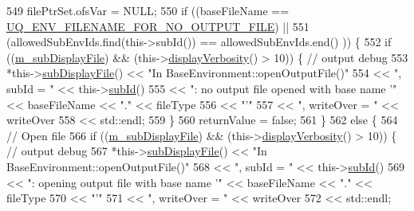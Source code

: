 \begin{DoxyCode}
549   filePtrSet.ofsVar = NULL;
550   \textcolor{keywordflow}{if} ((baseFileName                         == 
      \hyperlink{_environment_options_8h_a0b152a87af300fefc74156efb1526e67}{UQ\_ENV\_FILENAME\_FOR\_NO\_OUTPUT\_FILE}) ||
551       (allowedSubEnvIds.find(this->subId()) == allowedSubEnvIds.end()            )) \{
552     \textcolor{keywordflow}{if} ((\hyperlink{class_q_u_e_s_o_1_1_base_environment_a52b4275aa8ee85994dd304d9fe95c9c5}{m\_subDisplayFile}) && (this->\hyperlink{class_q_u_e_s_o_1_1_base_environment_a1fe5f244fc0316a0ab3e37463f108b96}{displayVerbosity}() > 10)) \{ \textcolor{comment}{// output
       debug}
553       *this->\hyperlink{class_q_u_e_s_o_1_1_base_environment_a8a0064746ae8dddfece4229b9ad374d6}{subDisplayFile}() << \textcolor{stringliteral}{"In BaseEnvironment::openOutputFile()"}
554                               << \textcolor{stringliteral}{", subId = "}     << this->\hyperlink{class_q_u_e_s_o_1_1_base_environment_a6ae3174897a9b3a4c85fa18da5d4c16f}{subId}()
555                               << \textcolor{stringliteral}{": no output file opened with base name '"} << baseFileName << \textcolor{stringliteral}{"."} << 
      fileType
556                               << \textcolor{stringliteral}{"'"}
557                               << \textcolor{stringliteral}{", writeOver = "} << writeOver
558                               << std::endl;
559     \}
560     returnValue = \textcolor{keyword}{false};
561   \}
562   \textcolor{keywordflow}{else} \{
564     \textcolor{comment}{// Open file}
566 \textcolor{comment}{}    \textcolor{keywordflow}{if} ((\hyperlink{class_q_u_e_s_o_1_1_base_environment_a52b4275aa8ee85994dd304d9fe95c9c5}{m\_subDisplayFile}) && (this->\hyperlink{class_q_u_e_s_o_1_1_base_environment_a1fe5f244fc0316a0ab3e37463f108b96}{displayVerbosity}() > 10)) \{ \textcolor{comment}{// output
       debug}
567       *this->\hyperlink{class_q_u_e_s_o_1_1_base_environment_a8a0064746ae8dddfece4229b9ad374d6}{subDisplayFile}() << \textcolor{stringliteral}{"In BaseEnvironment::openOutputFile()"}
568                               << \textcolor{stringliteral}{", subId = "}     << this->\hyperlink{class_q_u_e_s_o_1_1_base_environment_a6ae3174897a9b3a4c85fa18da5d4c16f}{subId}()
569                               << \textcolor{stringliteral}{": opening output file with base name '"} << baseFileName << \textcolor{stringliteral}{"."} << 
      fileType
570                               << \textcolor{stringliteral}{"'"}
571                               << \textcolor{stringliteral}{", writeOver = "} << writeOver
572                               << std::endl;

\end{DoxyCode}

